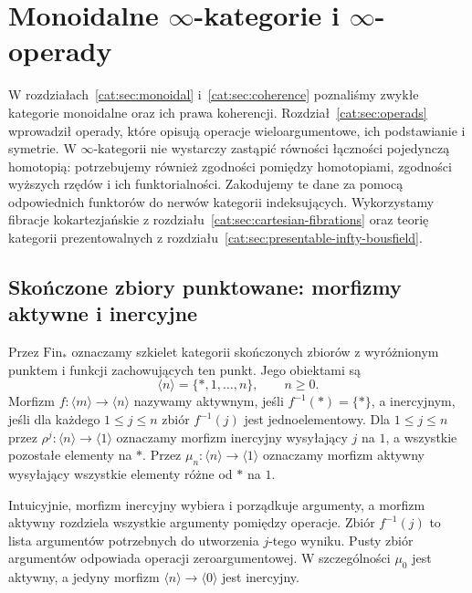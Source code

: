 \section{Monoidalne \texorpdfstring{$\infty$-kategorie i $\infty$-operady}{kategorie wyższe i operady wyższe}}\label{cat:sec:infty-monoidal-operads}

W rozdziałach~\ref{cat:sec:monoidal} i~\ref{cat:sec:coherence} poznaliśmy zwykłe kategorie monoidalne oraz ich prawa koherencji. Rozdział~\ref{cat:sec:operads} wprowadził operady, które opisują operacje wieloargumentowe, ich podstawianie i symetrie. W $\infty$-kategorii nie wystarczy zastąpić równości łączności pojedynczą homotopią: potrzebujemy również zgodności pomiędzy homotopiami, zgodności wyższych rzędów i ich funktorialności. Zakodujemy te dane za pomocą odpowiednich funktorów do nerwów kategorii indeksujących. Wykorzystamy fibracje kokartezjańskie z rozdziału~\ref{cat:sec:cartesian-fibrations} oraz teorię kategorii prezentowalnych z rozdziału~\ref{cat:sec:presentable-infty-bousfield}.

\subsection{Skończone zbiory punktowane: morfizmy aktywne i inercyjne}

\begin{definicja}\label{cat:def:infty-finpointed}
Przez $\mathrm{Fin}_*$ oznaczamy szkielet kategorii skończonych zbiorów z wyróżnionym punktem i funkcji zachowujących ten punkt. Jego obiektami są
\[
 \langle n\rangle=\{*,1,\ldots,n\},\qquad n\geq0.
\]
Morfizm $f:\langle m\rangle\to\langle n\rangle$ nazywamy aktywnym, jeśli $f^{-1}(*)=\{*\}$, a inercyjnym, jeśli dla każdego $1\leq j\leq n$ zbiór $f^{-1}(j)$ jest jednoelementowy. Dla $1\leq j\leq n$ przez $\rho^j:\langle n\rangle\to\langle1\rangle$ oznaczamy morfizm inercyjny wysyłający $j$ na $1$, a wszystkie pozostałe elementy na $*$. Przez $\mu_n:\langle n\rangle\to\langle1\rangle$ oznaczamy morfizm aktywny wysyłający wszystkie elementy różne od $*$ na $1$.
\end{definicja}

Intuicyjnie, morfizm inercyjny wybiera i porządkuje argumenty, a morfizm aktywny rozdziela wszystkie argumenty pomiędzy operacje. Zbiór $f^{-1}(j)$ to lista argumentów potrzebnych do utworzenia $j$-tego wyniku. Pusty zbiór argumentów odpowiada operacji zeroargumentowej. W szczególności $\mu_0$ jest aktywny, a jedyny morfizm $\langle n\rangle\to\langle0\rangle$ jest inercyjny.

